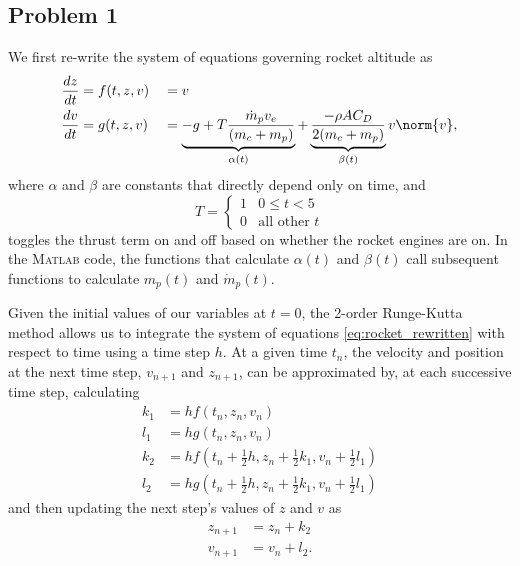 \documentclass[12pt]{article}
\begin{document}
\subsection{Problem 1}

We first re-write the system of equations governing rocket altitude as
\begin{equation}
\begin{aligned}
\frac{dz}{dt} &= f(t,z,v) &&= v
\\
\frac{dv}{dt} &= g(t,z,v) &&= \underbrace{-g + T \frac{\dot{m}_p v_e}{(m_c + m_p)}}_{\alpha(t)} + \underbrace{\frac{- \rho A C_D}{2 (m_c + m_p)}}_{\beta(t)} v \norm{v}
,
\end{aligned}
\label{eq:rocket_rewritten}
\end{equation}
where $\alpha$ and $\beta$ are constants that directly depend only on time, and
\begin{equation}
T =
\begin{cases}
1 & 0 \le t < 5 \\
0 & \text{all other $t$}
\end{cases}
\end{equation}
toggles the thrust term on and off based on whether the rocket engines are on. In the \textsc{Matlab} code, the functions that calculate $\alpha(t)$ and $\beta(t)$ call subsequent functions to calculate $m_p(t)$ and $\dot{m}_p(t)$.

Given the initial values of our variables at $t=0$, the 2\nd-order Runge-Kutta method allows us to integrate the system of equations \eqref{eq:rocket_rewritten} with respect to time using a time step $h$. At a given time $t_n$, the velocity and position at the next time step, $v_{n+1}$ and $z_{n+1}$, can be approximated by, at each successive time step, calculating
\begin{equation}
\begin{aligned}
k_1 &= h f(t_n, z_n, v_n)
\\
l_1 &= h g(t_n, z_n, v_n)
\\
k_2 &= h f(t_n + \tfrac{1}{2} h, z_n + \tfrac{1}{2} k_1, v_n + \tfrac{1}{2} l_1)
\\
l_2 &= h g(t_n + \tfrac{1}{2} h, z_n + \tfrac{1}{2} k_1, v_n + \tfrac{1}{2} l_1)
\end{aligned}
\end{equation}
and then updating the next step's values of $z$ and $v$ as
\begin{equation}
\begin{aligned}
z_{n+1} &= z_n + k_2
\\
v_{n+1} &= v_n + l_2
.
\end{aligned}
\end{equation}
\end{document}
